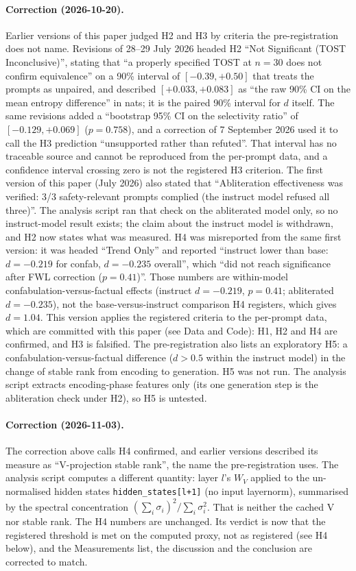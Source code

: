\documentclass[11pt,a4paper]{article}
\begin{document}
\paragraph{Correction (2026-10-20).}
Earlier versions of this paper judged H2 and H3 by criteria the
pre-registration does not name. Revisions of 28--29 July 2026 headed H2
``Not Significant (TOST Inconclusive)'', stating that ``a properly
specified TOST at $n{=}30$ does not confirm equivalence'' on a 90\%
interval of $[-0.39, +0.50]$ that treats the prompts as unpaired, and
described $[+0.033, +0.083]$ as ``the raw 90\% CI on the mean entropy
difference'' in nats; it is the paired 90\% interval for $d$ itself.
The same revisions added a ``bootstrap 95\% CI on the selectivity
ratio'' of $[-0.129, +0.069]$ ($p{=}0.758$), and a correction of 7
September 2026 used it to call the H3 prediction ``unsupported rather
than refuted''. That interval has no traceable source and cannot be
reproduced from the per-prompt data, and a confidence interval crossing
zero is not the registered H3 criterion. The first version of this paper
(July 2026) also stated that ``Abliteration effectiveness was verified:
3/3 safety-relevant prompts complied (the instruct model refused all
three)''. The analysis script ran that check on the abliterated model
only, so no instruct-model result exists; the claim about the instruct
model is withdrawn, and H2 now states what was measured. H4 was
misreported from the same first version: it was headed ``Trend Only''
and reported ``instruct lower than base: $d{=}-0.219$ for confab,
$d{=}-0.235$ overall'', which ``did not reach significance after FWL
correction ($p{=}0.41$)''. Those numbers are within-model
confabulation-versus-factual effects (instruct $d = -0.219$,
$p = 0.41$; abliterated $d = -0.235$), not the base-versus-instruct
comparison H4 registers, which gives $d = 1.04$. This version applies
the registered criteria to the per-prompt data, which are committed
with this paper (see Data and Code): H1, H2 and H4 are confirmed, and
H3 is falsified. The pre-registration also lists an exploratory H5:
a confabulation-versus-factual difference ($d > 0.5$ within the
instruct model) in the change of stable rank from encoding to
generation. H5 was not run. The analysis script extracts
encoding-phase features only (its one generation step is the
abliteration check under H2), so H5 is untested.

\paragraph{Correction (2026-11-03).}
The correction above calls H4 confirmed, and earlier versions
described its measure as ``V-projection stable rank'', the name the
pre-registration uses. The analysis script computes a different
quantity: layer $l$'s $W_V$ applied to the un-normalised hidden states
\texttt{hidden\_states[l+1]} (no input layernorm), summarised by the
spectral concentration $(\sum_i \sigma_i)^2 / \sum_i \sigma_i^2$. That
is neither the cached V nor stable rank. The H4 numbers are unchanged.
Its verdict is now that the registered threshold is met on the
computed proxy, not as registered (see H4 below), and the Measurements
list, the discussion and the conclusion are corrected to match.
\end{document}
